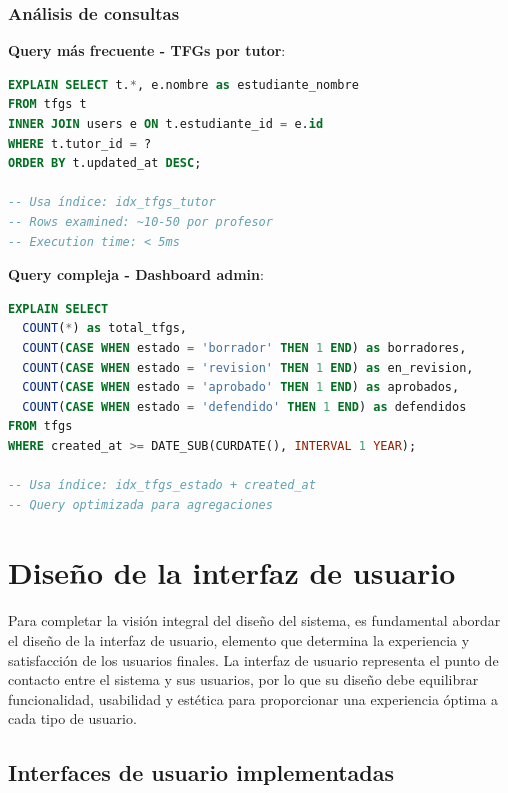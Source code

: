 \documentclass[12pt,a4paper,oneside]{report}
\begin{document}
\subsubsection{Análisis de consultas}\label{anuxe1lisis-de-consultas}

\textbf{Query más frecuente - TFGs por tutor}:

\begin{lstlisting}[language=SQL]
EXPLAIN SELECT t.*, e.nombre as estudiante_nombre
FROM tfgs t 
INNER JOIN users e ON t.estudiante_id = e.id
WHERE t.tutor_id = ? 
ORDER BY t.updated_at DESC;

-- Usa índice: idx_tfgs_tutor
-- Rows examined: ~10-50 por profesor
-- Execution time: < 5ms
\end{lstlisting}

\textbf{Query compleja - Dashboard admin}:

\begin{lstlisting}[language=SQL]
EXPLAIN SELECT 
  COUNT(*) as total_tfgs,
  COUNT(CASE WHEN estado = 'borrador' THEN 1 END) as borradores,
  COUNT(CASE WHEN estado = 'revision' THEN 1 END) as en_revision,
  COUNT(CASE WHEN estado = 'aprobado' THEN 1 END) as aprobados,
  COUNT(CASE WHEN estado = 'defendido' THEN 1 END) as defendidos
FROM tfgs 
WHERE created_at >= DATE_SUB(CURDATE(), INTERVAL 1 YEAR);

-- Usa índice: idx_tfgs_estado + created_at
-- Query optimizada para agregaciones
\end{lstlisting}

\section{Diseño de la interfaz de
usuario}\label{diseuxf1o-de-la-interfaz-de-usuario}

Para completar la visión integral del diseño del sistema, es fundamental
abordar el diseño de la interfaz de usuario, elemento que determina la
experiencia y satisfacción de los usuarios finales. La interfaz de
usuario representa el punto de contacto entre el sistema y sus usuarios,
por lo que su diseño debe equilibrar funcionalidad, usabilidad y
estética para proporcionar una experiencia óptima a cada tipo de
usuario.

\subsection{Interfaces de usuario implementadas}\label{interfaces-de-usuario-implementadas}
\end{document}
